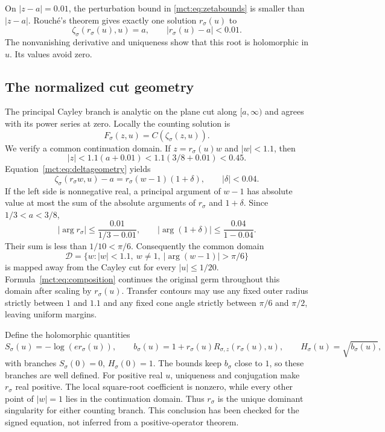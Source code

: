 \documentclass[11pt]{article}
\theoremstyle{definition}
\newcommand{\Cay}{C}
\begin{document}
On $|z-a|=0.01$, the perturbation bound in \eqref{mct:eq:zetabounds} is smaller than $|z-a|$. Rouch\'e's theorem gives exactly one solution $r_\sigma(u)$ to
\begin{equation}\label{mct:eq:radius}
 \zeta_\sigma(r_\sigma(u),u)=a,\qquad |r_\sigma(u)-a|<0.01.
\end{equation}
The nonvanishing derivative and uniqueness show that this root is holomorphic in $u$. Its values avoid zero.

\subsection{The normalized cut geometry}
The principal Cayley branch is analytic on the plane cut along $[a,\infty)$ and agrees with its power series at zero. Locally the counting solution is
\begin{equation}\label{mct:eq:composition}
 F_\sigma(z,u)=\Cay(\zeta_\sigma(z,u)).
\end{equation}
We verify a common continuation domain. If $z=r_\sigma(u)w$ and $|w|<1.1$, then
\[
 |z|<1.1(a+0.01)<1.1(3/8+0.01)<0.45.
\]
Equation~\eqref{mct:eq:deltageometry} yields
\[
 \zeta_\sigma(r_\sigma w,u)-a=r_\sigma(w-1)(1+\delta),
 \qquad |\delta|<0.04.
\]
If the left side is nonnegative real, a principal argument of $w-1$ has absolute value at most the sum of the absolute arguments of $r_\sigma$ and $1+\delta$. Since $1/3<a<3/8$,
\[
 |\arg r_\sigma|\le\frac{0.01}{1/3-0.01},\qquad
 |\arg(1+\delta)|\le\frac{0.04}{1-0.04}.
\]
Their sum is less than $1/10<\pi/6$. Consequently the common domain
\begin{equation}\label{mct:eq:Delta}
 \mathcal D=\{w:|w|<1.1,\ w\ne1,\ |\arg(w-1)|>\pi/6\}
\end{equation}
is mapped away from the Cayley cut for every $|u|\le1/20$. Formula~\eqref{mct:eq:composition} continues the original germ throughout this domain after scaling by $r_\sigma(u)$. Transfer contours may use any fixed outer radius strictly between $1$ and $1.1$ and any fixed cone angle strictly between $\pi/6$ and $\pi/2$, leaving uniform margins.

Define the holomorphic quantities
\begin{equation}\label{mct:eq:SHb}
 S_\sigma(u)=-\log(e r_\sigma(u)),\qquad
 b_\sigma(u)=1+r_\sigma(u)R_{\sigma,z}(r_\sigma(u),u),\qquad
 H_\sigma(u)=\sqrt{b_\sigma(u)},
\end{equation}
with branches $S_\sigma(0)=0$, $H_\sigma(0)=1$. The bounds keep $b_\sigma$ close to $1$, so these branches are well defined. For positive real $u$, uniqueness and conjugation make $r_\sigma$ real positive. The local square-root coefficient is nonzero, while every other point of $|w|=1$ lies in the continuation domain. Thus $r_\sigma$ is the unique dominant singularity for either counting branch. This conclusion has been checked for the signed equation, not inferred from a positive-operator theorem.
\end{document}
